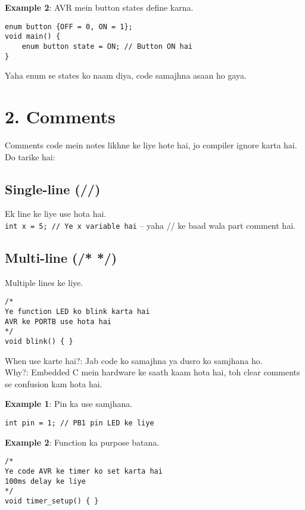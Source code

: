 \documentclass[a4paper,12pt]{article}
\begin{document}
\begin{examplebox}
\textbf{Example 2}: AVR mein button states define karna. \\
\begin{lstlisting}
enum button {OFF = 0, ON = 1};
void main() {
    enum button state = ON; // Button ON hai
}
\end{lstlisting}
Yaha enum se states ko naam diya, code samajhna asaan ho gaya.
\end{examplebox}

\section*{\textbf{\LARGE \textcolor{headingblue}{2. Comments}}}
Comments code mein notes likhne ke liye hote hai, jo compiler ignore karta hai. Do tarike hai:

\subsection*{Single-line (//)}
Ek line ke liye use hota hai. \\
\texttt{int x = 5; // Ye x variable hai} – yaha // ke baad wala part comment hai.

\subsection*{Multi-line (/* */)}
Multiple lines ke liye. \\
\begin{lstlisting}
/*
Ye function LED ko blink karta hai
AVR ke PORTB use hota hai
*/
void blink() { }
\end{lstlisting}

\textcolor{warningred}{When use karte hai?}: Jab code ko samajhna ya dusro ko samjhana ho. \\
\textcolor{warningred}{Why?}: Embedded C mein hardware ke saath kaam hota hai, toh clear comments se confusion kam hota hai.

\begin{examplebox}
\textbf{Example 1}: Pin ka use samjhana. \\
\begin{lstlisting}
int pin = 1; // PB1 pin LED ke liye
\end{lstlisting}
\end{examplebox}

\begin{examplebox}
\textbf{Example 2}: Function ka purpose batana. \\
\begin{lstlisting}
/* 
Ye code AVR ke timer ko set karta hai
100ms delay ke liye
*/
void timer_setup() { }
\end{lstlisting}
\end{examplebox}
\end{document}
